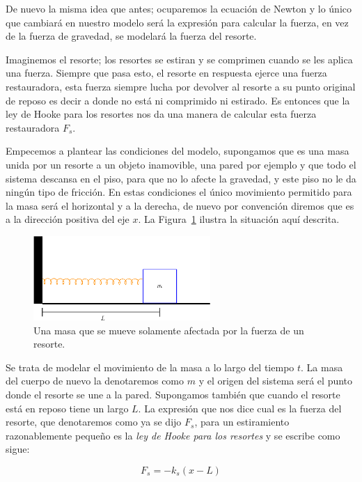 De nuevo la misma idea que antes; ocuparemos la ecuación de Newton y lo único que cambiará en nuestro modelo será la expresión para calcular la fuerza, en vez de la fuerza de gravedad, se modelará la fuerza del resorte.

Imaginemos el resorte; los resortes se estiran y se comprimen cuando se les aplica una fuerza.
Siempre que pasa esto, el resorte en respuesta ejerce una fuerza restauradora, esta fuerza siempre lucha por devolver al resorte a su punto original de reposo es decir a donde no está ni comprimido ni estirado.
Es entonces que la ley de Hooke para los resortes nos da una manera de calcular esta fuerza restauradora $F_s$.

Empecemos a plantear las condiciones del modelo, supongamos que es una masa unida por un resorte a un objeto inamovible, una pared por ejemplo y que todo el sistema descansa en el piso, para que no lo afecte la gravedad, y este piso no le da ningún tipo de fricción.
En estas condiciones el único movimiento permitido para la masa será el horizontal y a la derecha, de nuevo por convención diremos que es a la dirección positiva del eje $x$.
La Figura~\ref{masaResorte:fig} ilustra la situación aquí descrita.

\begin{figure}[htb]
 \centering
 \includegraphics[width=0.6\textwidth]{Img/01/masaResorte}
 \caption[Masa unida por un resorte]{ 
 Una masa que se mueve solamente afectada por la fuerza de un resorte.
 } \label{masaResorte:fig}
\end{figure}

Se trata de modelar el movimiento de la masa a lo largo del tiempo $t$.
La masa del cuerpo de nuevo la denotaremos como $m$ y el origen del sistema será el punto donde el resorte se une a la pared.
Supongamos también que cuando el resorte está en reposo tiene un largo $L$.
La expresión que nos dice cual es la fuerza del resorte, que denotaremos como ya se dijo $F_s$, para un estiramiento razonablemente pequeño es la \emph{ley de Hooke para los resortes} y se escribe como sigue:

\begin{equation}
F_s = -k_s \left( x - L \right)
\end{equation}

